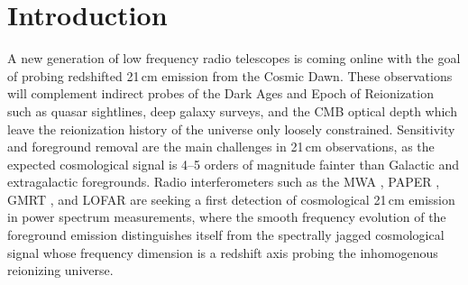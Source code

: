 \documentclass[preprint]{aastex}
\begin{document}


\section{Introduction}

A new generation of low frequency radio telescopes is coming online with the goal of
 probing redshifted 21\,cm emission from the Cosmic Dawn. These observations will 
 complement indirect probes of the Dark Ages and Epoch of Reionization such as quasar 
 sightlines, deep galaxy surveys, and the CMB optical depth which leave the reionization 
 history of the universe only loosely constrained. Sensitivity and foreground removal are 
 the main challenges in 21\,cm observations, as the expected cosmological signal is 4--5 
 orders of magnitude fainter than Galactic and extragalactic foregrounds. Radio 
 interferometers such as the MWA \citep{tingay13}, PAPER \citep{ali2015}, GMRT 
 \citep{Paciga2011}, and LOFAR \citep{lofar} are seeking a first detection of 
 cosmological 21\,cm emission in power spectrum measurements, where the smooth 
 frequency evolution of the foreground emission distinguishes itself from the spectrally 
 jagged cosmological signal whose frequency dimension is a redshift axis probing the 
 inhomogenous reionizing universe.

\end{document}
